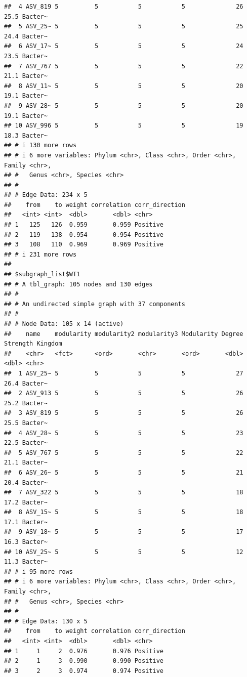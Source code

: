 \documentclass[
]{book}
\begin{document}
\begin{verbatim}
##  4 ASV_819 5          5           5           5              26     25.5 Bacter~
##  5 ASV_25~ 5          5           5           5              25     24.4 Bacter~
##  6 ASV_17~ 5          5           5           5              24     23.5 Bacter~
##  7 ASV_767 5          5           5           5              22     21.1 Bacter~
##  8 ASV_11~ 5          5           5           5              20     19.1 Bacter~
##  9 ASV_28~ 5          5           5           5              20     19.1 Bacter~
## 10 ASV_996 5          5           5           5              19     18.3 Bacter~
## # i 130 more rows
## # i 6 more variables: Phylum <chr>, Class <chr>, Order <chr>, Family <chr>,
## #   Genus <chr>, Species <chr>
## #
## # Edge Data: 234 x 5
##    from    to weight correlation corr_direction
##   <int> <int>  <dbl>       <dbl> <chr>         
## 1   125   126  0.959       0.959 Positive      
## 2   119   138  0.954       0.954 Positive      
## 3   108   110  0.969       0.969 Positive      
## # i 231 more rows
## 
## $subgraph_list$WT1
## # A tbl_graph: 105 nodes and 130 edges
## #
## # An undirected simple graph with 37 components
## #
## # Node Data: 105 x 14 (active)
##    name    modularity modularity2 modularity3 Modularity Degree Strength Kingdom
##    <chr>   <fct>      <ord>       <chr>       <ord>       <dbl>    <dbl> <chr>  
##  1 ASV_25~ 5          5           5           5              27     26.4 Bacter~
##  2 ASV_913 5          5           5           5              26     25.2 Bacter~
##  3 ASV_819 5          5           5           5              26     25.5 Bacter~
##  4 ASV_28~ 5          5           5           5              23     22.5 Bacter~
##  5 ASV_767 5          5           5           5              22     21.1 Bacter~
##  6 ASV_26~ 5          5           5           5              21     20.4 Bacter~
##  7 ASV_322 5          5           5           5              18     17.2 Bacter~
##  8 ASV_15~ 5          5           5           5              18     17.1 Bacter~
##  9 ASV_18~ 5          5           5           5              17     16.3 Bacter~
## 10 ASV_25~ 5          5           5           5              12     11.3 Bacter~
## # i 95 more rows
## # i 6 more variables: Phylum <chr>, Class <chr>, Order <chr>, Family <chr>,
## #   Genus <chr>, Species <chr>
## #
## # Edge Data: 130 x 5
##    from    to weight correlation corr_direction
##   <int> <int>  <dbl>       <dbl> <chr>         
## 1     1     2  0.976       0.976 Positive      
## 2     1     3  0.990       0.990 Positive      
## 3     2     3  0.974       0.974 Positive      

\end{verbatim}
\end{document}
